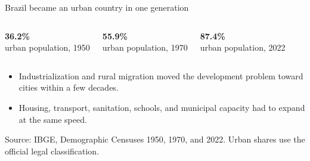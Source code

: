 \documentclass[10pt,aspectratio=169]{beamer}
\newcommand{\source}[1]{%
  \par\vfill{\tiny\color{MidGray}Source: #1}}
\newcommand{\muted}[1]{\textcolor{MidGray}{#1}}
\begin{document}
\begin{frame}{Brazil became an urban country in one generation}
  \begin{columns}[T,onlytextwidth]
      \begin{center}
        {\fontsize{32}{36}\selectfont\color{DeepNavy}\textbf{36.2\%}}\\[-.05cm]
        \muted{urban population, 1950}
      \end{center}
      \begin{center}
        {\fontsize{32}{36}\selectfont\color{BrazilGreen}\textbf{55.9\%}}\\[-.05cm]
        \muted{urban population, 1970}
      \end{center}
      \begin{center}
        {\fontsize{32}{36}\selectfont\color{DeepNavy}\textbf{87.4\%}}\\[-.05cm]
        \muted{urban population, 2022}
      \end{center}
  \end{columns}
  \vspace{.55cm}
  \begin{itemize}
    \item Industrialization and rural migration moved the development problem toward cities within a few decades.
    \item Housing, transport, sanitation, schools, and municipal capacity had to expand at the same speed.
  \end{itemize}
  \source{IBGE, Demographic Censuses 1950, 1970, and 2022. Urban shares use the official legal classification.}
\end{frame}
\end{document}
